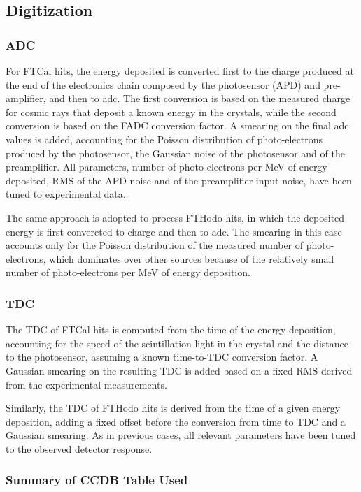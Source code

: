 \subsection{Digitization}

\subsubsection{ADC}
For FTCal hits, the energy deposited is converted first to the charge produced at the end of the electronics chain composed by the photosensor (APD) and pre-amplifier, and then to adc. The first conversion is based on the measured charge for cosmic rays that deposit a known energy in the crystals, while the second conversion is based on the FADC conversion factor. A smearing on the final adc values is added, accounting for the Poisson distribution of photo-electrons produced by the photosensor, the Gaussian noise of the photosensor and of the preamplifier. All parameters, number of photo-electrons per MeV of energy deposited, RMS of the APD noise and of the preamplifier input noise, have been tuned to experimental data.

The same approach is adopted to process FTHodo hits, in which the deposited energy is first convereted to charge and then to adc. The smearing in this case accounts only for the Poisson distribution of the measured number of photo-electrons, which dominates over other sources because of the relatively small number of photo-electrons per MeV of energy deposition.

\subsubsection{TDC}
The TDC of FTCal hits is computed from the time of the energy deposition, accounting for the speed of the scintillation light in the crystal and the distance to the photosensor, assuming a known time-to-TDC conversion factor. A Gaussian smearing on the resulting TDC is added based on a fixed RMS derived from the experimental measurements.

Similarly, the TDC of FTHodo hits is derived from the time of a given energy deposition, adding a fixed offset before the conversion from time to TDC and a Gaussian smearing. As in previous cases, all relevant parameters have been tuned to the observed detector response.

\subsubsection{Summary of CCDB Table Used}
